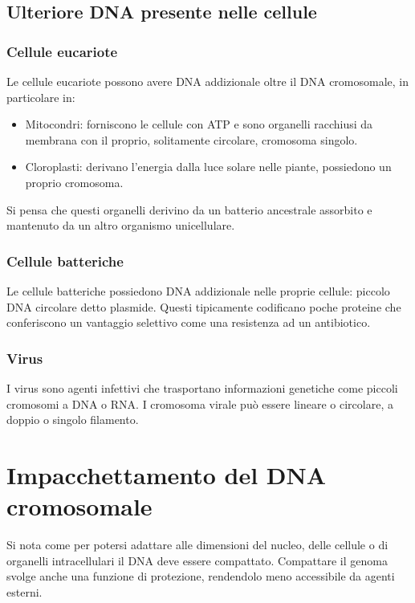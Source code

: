\subsection{Ulteriore DNA presente nelle cellule}
\subsubsection{Cellule eucariote}
Le cellule eucariote possono avere DNA addizionale oltre il DNA cromosomale, in particolare in:
\begin{itemize}
	\item Mitocondri: forniscono le cellule con ATP e sono organelli racchiusi da membrana con il proprio, solitamente circolare, cromosoma singolo.
	\item Cloroplasti: derivano l'energia dalla luce solare nelle piante, possiedono un proprio cromosoma.
\end{itemize}
Si pensa che questi organelli derivino da un batterio ancestrale assorbito e mantenuto da un altro organismo unicellulare.
\subsubsection{Cellule batteriche}
Le cellule batteriche possiedono DNA addizionale nelle proprie cellule: piccolo DNA circolare detto plasmide. Questi tipicamente codificano poche proteine che conferiscono un vantaggio
selettivo come una resistenza ad un antibiotico.
\subsubsection{Virus}
I virus sono agenti infettivi che trasportano informazioni genetiche come piccoli cromosomi a DNA o RNA. I cromosoma virale pu\`o essere lineare o circolare, a doppio o singolo 
filamento.
\section{Impacchettamento del DNA cromosomale}
Si nota come per potersi adattare alle dimensioni del nucleo, delle cellule o di organelli intracellulari il DNA deve essere compattato. Compattare il genoma svolge anche una funzione
di protezione, rendendolo meno accessibile da agenti esterni. 
